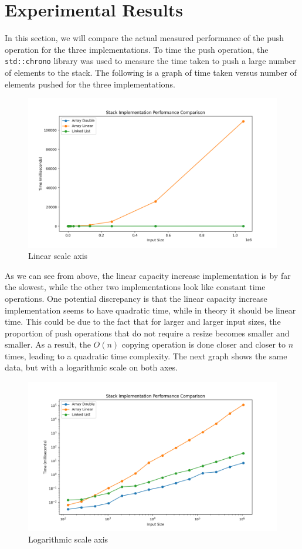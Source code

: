 \documentclass{article}
\begin{document}
\section{Experimental Results}
In this section, we will compare the actual measured performance of the push operation for the three implementations. 
To time the push operation, the \texttt{std::chrono} library was used to measure the time taken to push a large number of elements to the stack.
The following is a graph of time taken versus number of elements pushed for the three implementations.
\begin{figure}[h]
    \centering
    \includegraphics[width=\textwidth]{./images/Figure_1.png}
    \caption{Linear scale axis}
\end{figure}

As we can see from above, the linear capacity increase implementation is by far the slowest, while the other two implementations look like constant time operations. 
One potential discrepancy is that the linear capacity increase implementation seems to have quadratic time, while in theory it should be linear time. 
This could be due to the fact that for larger and larger input sizes, the proportion of push operations that do not require a resize becomes smaller and smaller. 
As a result, the $O(n)$ copying operation is done closer and closer to $n$ times, leading to a quadratic time complexity.
The next graph shows the same data, but with a logarithmic scale on both axes.

\newpage
\begin{figure}[h]
    \centering
    \includegraphics[width=\textwidth]{./images/Figure_2.png}
    \caption{Logarithmic scale axis}
\end{figure}
\end{document}
